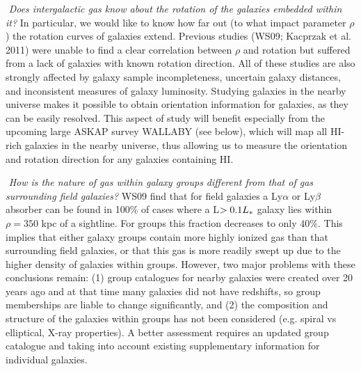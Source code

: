 \documentclass[iop]{emulateapj-rtx4}
\begin{document}
\vspace{10pt}
\indent \textbullet $ $ \textit{Does intergalactic gas know about the rotation of the galaxies embedded within it?} In particular, we would like to know how far out (to what impact parameter $\rho$) the rotation curves of galaxies extend. Previous studies (WS09; Kacprzak et al. 2011) were unable to find a clear correlation between $\rho$ and rotation but suffered from a lack of galaxies with known rotation direction. All of these studies are also strongly affected by galaxy sample incompleteness, uncertain galaxy distances, and inconsistent measures of galaxy luminosity. Studying galaxies in the nearby universe makes it possible to obtain orientation information for galaxies, as they can be easily resolved. This aspect of study will benefit especially from the upcoming large ASKAP survey WALLABY (see below), which will map all HI-rich galaxies in the nearby universe, thus allowing us to measure the orientation and rotation direction for any galaxies containing HI.

\vspace{10pt}
\indent \textbullet $ $ \textit{How is the nature of gas within galaxy groups different from that of gas surrounding field galaxies?} WS09 find that for field galaxies a Ly$\alpha$ or Ly$\beta$ absorber can be found in 100$\%$ of cases where a L$>0.1L_{\**}$ galaxy lies within $\rho=350$ kpc of a sightline. For groups this fraction decreases to only $40\%$. This implies that either galaxy groups contain more highly ionized gas than that surrounding field galaxies, or that this gas is more readily swept up due to the higher density of galaxies within groups. However, two major problems with these conclusions remain: (1) group catalogues for nearby galaxies were created over 20 years ago and at that time many galaxies did not have redshifts, so group memberships are liable to change significantly, and (2) the composition and structure of the galaxies within groups has not been considered (e.g. spiral vs elliptical, X-ray properties). A better assessment requires an updated group catalogue and taking into account existing supplementary information for individual galaxies.

\vspace{15pt}
\end{document}
